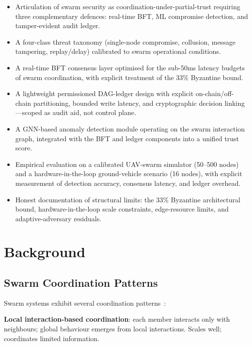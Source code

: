 \documentclass[sigconf,nonacm]{acmart}
\begin{document}
\begin{itemize}
  \item Articulation of swarm security as
        coordination-under-partial-trust requiring three
        complementary defences: real-time BFT, ML compromise
        detection, and tamper-evident audit ledger.
  \item A four-class threat taxonomy (single-node compromise,
        collusion, message tampering, replay/delay) calibrated
        to swarm operational conditions.
  \item A real-time BFT consensus layer optimised for the
        sub-50ms latency budgets of swarm coordination, with
        explicit treatment of the 33\% Byzantine bound.
  \item A lightweight permissioned DAG-ledger design
        with explicit on-chain/off-chain partitioning,
        bounded write latency, and cryptographic decision
        linking---scoped as audit aid, not control plane.
  \item A GNN-based anomaly detection module operating on the
        swarm interaction graph, integrated with the BFT and
        ledger components into a unified trust score.
  \item Empirical evaluation on a calibrated UAV-swarm simulator
        (50--500 nodes) and a hardware-in-the-loop ground-vehicle
        scenario (16 nodes), with explicit measurement of
        detection accuracy, consensus latency, and ledger
        overhead.
  \item Honest documentation of structural limits: the 33\%
        Byzantine architectural bound, hardware-in-the-loop
        scale constraints, edge-resource limits, and
        adaptive-adversary residuals.
\end{itemize}

\section{Background}

\subsection{Swarm Coordination Patterns}

Swarm systems exhibit several coordination
patterns~\cite{brambilla2024swarmsurv,saxena2024dronesurv}:

\textbf{Local interaction-based coordination}: each member
interacts only with neighbours; global behaviour emerges from
local interactions. Scales well; coordinates limited
information.
\end{document}
